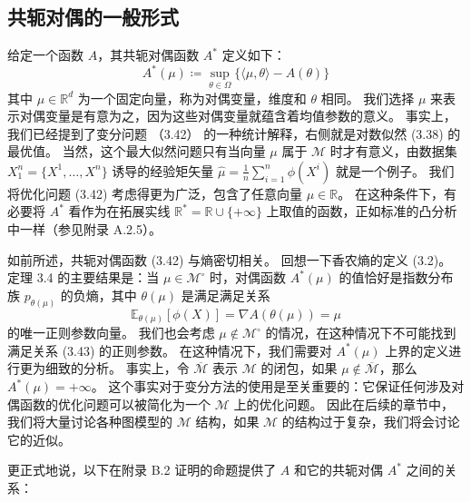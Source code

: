 \subsection{共轭对偶的一般形式}

给定一个函数 $A$，其共轭对偶函数 $A^*$ 定义如下：
\begin{equation}
    A^*(\mu) \coloneqq \sup_{\theta \in \Omega}\{\langle \mu, \theta \rangle - A(\theta)\}
\end{equation}
其中 $\mu \in \mathbb{R}^d$ 为一个固定向量，称为对偶变量，维度和 $\theta$ 相同。
我们选择 $\mu$ 来表示对偶变量是有意为之，因为这些对偶变量就蕴含着均值参数的意义。
事实上，我们已经提到了变分问题 （3.42） 的一种统计解释，右侧就是对数似然 (3.38) 的最优值。
当然，这个最大似然问题只有当向量 $\mu$ 属于 $\mathcal{M}$ 时才有意义，由数据集 $X_1^n = \{X^1, \dots, X^n\}$ 诱导的经验矩矢量 $\hat{\mu} = \frac{1}{n}\sum_{i = 1}^n\phi(X^i)$ 就是一个例子。
我们将优化问题 (3.42) 考虑得更为广泛，包含了任意向量 $\mu \in \mathbb{R}$。
在这种条件下，有必要将 $A^*$ 看作为在拓展实线 $\mathbb{R}^* = \mathbb{R} \cup \{+\infty\}$ 上取值的函数，正如标准的凸分析中一样（参见附录 A.2.5）。

如前所述，共轭对偶函数 (3.42) 与熵密切相关。
回想一下香农熵的定义 (3.2)。
定理 3.4 的主要结果是：当 $\mu \in \mathcal{M}^\circ$ 时，对偶函数 $A^*(\mu)$ 的值恰好是指数分布族 $p_{\theta(\mu)}$ 的负熵，其中 $\theta(\mu)$ 是满足满足关系
\begin{equation}
    \mathbb{E}_{\theta(\mu)}[\phi(X)] = \nabla A(\theta(\mu)) = \mu
\end{equation}
的唯一正则参数向量。
我们也会考虑 $\mu \notin \mathcal{M}^\circ$ 的情况，在这种情况下不可能找到满足关系 (3.43) 的正则参数。
在这种情况下，我们需要对 $A^*(\mu)$ 上界的定义进行更为细致的分析。
事实上，令 $\overline{\mathcal{M}}$ 表示 $\mathcal{M}$ 的闭包，如果 $\mu \notin \overline{\mathcal{M}}$，那么 $A^*(\mu) = +\infty$。
这个事实对于变分方法的使用是至关重要的：它保证任何涉及对偶函数的优化问题可以被简化为一个 $\mathcal{M}$ 上的优化问题。
因此在后续的章节中，我们将大量讨论各种图模型的 $\mathcal{M}$ 结构，如果 $\mathcal{M}$ 的结构过于复杂，我们将会讨论它的近似。

更正式地说，以下在附录 B.2 证明的命题提供了 $A$ 和它的共轭对偶 $A^*$ 之间的关系：

